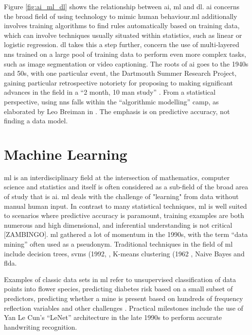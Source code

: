 Figure \ref{fig:ai_ml_dl} shows the relationship between \gls{ai}, \gls{ml} and \gls{dl}. \gls{ai} concerns the broad field of using technology to mimic human behaviour.\gls{ml} additionally involves training algorithms to find rules automatically based on training data, which can involve techniques usually situated within statistics, such as linear or logistic regression. \gls{dl} takes this a step further, concern the use of multi-layered \gls{nn}s trained on a large pool of training data to perform even more complex tasks, such as image segmentation or video captioning. The roots of \gls{ai} goes to the 1940s and 50s, with one particular event, the Dartmouth Summer Research Project, gaining particular retrospective notoriety for proposing to making significant advances in the field in a \enquote{2 month, 10 man study}  \cite{dartmouth_summer}. From a statistical perspective, using \gls{nn}s falls within the \enquote{algorithmic modelling} camp, as elaborated by Leo Breiman in \cite{two_cultures}. The emphasis is on predictive accuracy, not finding a data model.

\section{Machine Learning}

\gls{ml} is an interdisciplinary field at the intersection of mathematics, computer science and statistics and itself is often considered as a sub-field of the broad area of study that is  \gls{ai}. \gls{ml} deals with the challenge of "learning" from data without manual human input. In contrast to many statistical techniques, \gls{ml} is well suited to scenarios where predictive accuracy is paramount, training examples are both numerous and high dimensional, and inferential understanding is not critical [ZAMBINGO]. \gls{ml} gathered a lot of momentum in the 1990s, with the term \enquote{data mining} often used as a pseudonym. Traditional techniques in the field of \gls{ml} include decision trees,  \gls{svm}s (1992, \cite{svm}, K-means clustering (1962 \cite{k_means}, Naive Bayes and  \gls{flda}.  \bigskip

Examples of classic data sets in \gls{ml} refer to unsupervised classification of data points into flower species, predicting diabetes risk based on a small subset of predictors, predicting whether a mine is present based on hundreds of frequency reflection variables and other challenges \cite{uci_ml_data}. Practical milestones include the use of Yan Le Cun's \enquote{LeNet} architecture in the late 1990s to perform accurate handwriting recognition. 

